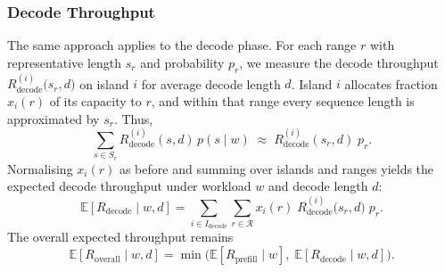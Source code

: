 \subsubsection*{Decode Throughput}

The same approach applies to the decode phase.
For each range \(r\) with representative length \(s_r\) and probability \(p_r\), we measure the decode throughput \(R_{\mathrm{decode}}^{(i)}\bigl(s_r,d\bigr)\) on island \(i\) for average decode length \(d\).
Island \(i\) allocates fraction \(x_i(r)\) of its capacity to \(r\), and within that range every sequence length is approximated by \(s_r\).  Thus,
\[
\sum_{s\in S_r} R_{\mathrm{decode}}^{(i)}(s,d)\,p(s\mid w)\;\approx\;
R_{\mathrm{decode}}^{(i)}(s_r,d)\;p_r.
\]
Normalising \(x_i(r)\) as before and summing over islands and ranges yields the expected decode throughput under workload \(w\) and decode length \(d\):
\[
\mathbb{E}[R_{\mathrm{decode}}\mid w,d]
=\sum_{i\in I_{\mathrm{decode}}}\sum_{r\in\mathcal{R}}
x_i(r)\;R_{\mathrm{decode}}^{(i)}\bigl(s_r,d\bigr)\;p_r.
\]
The overall expected throughput remains
\[
\mathbb{E}[R_{\mathrm{overall}}\mid w,d]
=\min\bigl(\mathbb{E}[R_{\mathrm{prefill}}\mid w],\;\mathbb{E}[R_{\mathrm{decode}}\mid w,d]\bigr).
\]




